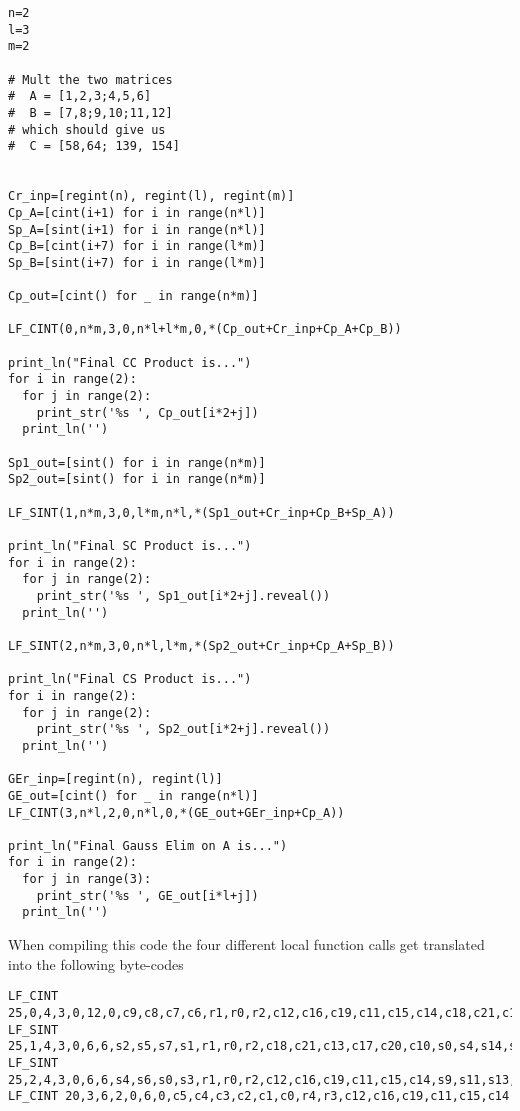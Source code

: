 \begin{lstlisting}
n=2
l=3
m=2

# Mult the two matrices
#  A = [1,2,3;4,5,6]
#  B = [7,8;9,10;11,12]
# which should give us
#  C = [58,64; 139, 154]


Cr_inp=[regint(n), regint(l), regint(m)]
Cp_A=[cint(i+1) for i in range(n*l)]
Sp_A=[sint(i+1) for i in range(n*l)]
Cp_B=[cint(i+7) for i in range(l*m)]
Sp_B=[sint(i+7) for i in range(l*m)]

Cp_out=[cint() for _ in range(n*m)]

LF_CINT(0,n*m,3,0,n*l+l*m,0,*(Cp_out+Cr_inp+Cp_A+Cp_B))

print_ln("Final CC Product is...")
for i in range(2):
  for j in range(2):
    print_str('%s ', Cp_out[i*2+j])
  print_ln('')

Sp1_out=[sint() for i in range(n*m)]
Sp2_out=[sint() for i in range(n*m)]

LF_SINT(1,n*m,3,0,l*m,n*l,*(Sp1_out+Cr_inp+Cp_B+Sp_A))

print_ln("Final SC Product is...")
for i in range(2):
  for j in range(2):
    print_str('%s ', Sp1_out[i*2+j].reveal())
  print_ln('')

LF_SINT(2,n*m,3,0,n*l,l*m,*(Sp2_out+Cr_inp+Cp_A+Sp_B))

print_ln("Final CS Product is...")
for i in range(2):
  for j in range(2):
    print_str('%s ', Sp2_out[i*2+j].reveal())
  print_ln('')

GEr_inp=[regint(n), regint(l)]
GE_out=[cint() for _ in range(n*l)]
LF_CINT(3,n*l,2,0,n*l,0,*(GE_out+GEr_inp+Cp_A))

print_ln("Final Gauss Elim on A is...")
for i in range(2):
  for j in range(3):
    print_str('%s ', GE_out[i*l+j])
  print_ln('')
\end{lstlisting}
When compiling this code the four different local function calls
get translated into the following byte-codes
\begin{lstlisting}
LF_CINT 25,0,4,3,0,12,0,c9,c8,c7,c6,r1,r0,r2,c12,c16,c19,c11,c15,c14,c18,c21,c13,c17,c20,c10 
LF_SINT 25,1,4,3,0,6,6,s2,s5,s7,s1,r1,r0,r2,c18,c21,c13,c17,c20,c10,s0,s4,s14,s15,s3,s6 
LF_SINT 25,2,4,3,0,6,6,s4,s6,s0,s3,r1,r0,r2,c12,c16,c19,c11,c15,c14,s9,s11,s13,s8,s10,s12 
LF_CINT 20,3,6,2,0,6,0,c5,c4,c3,c2,c1,c0,r4,r3,c12,c16,c19,c11,c15,c14 
\end{lstlisting}







